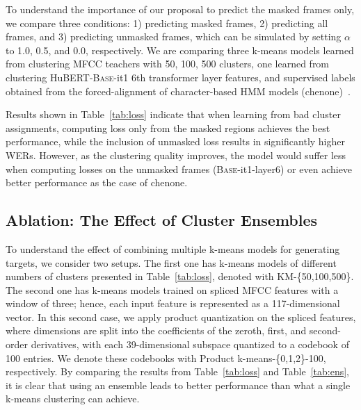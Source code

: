 To understand the importance of our proposal to predict the masked frames only, we compare three conditions: 1) predicting masked frames, 2) predicting all frames, and 3) predicting unmasked frames, which can be simulated by setting $\alpha$ to 1.0, 0.5, and 0.0, respectively. 
We are comparing three k-means models learned from clustering MFCC teachers with 50, 100, 500 clusters, one learned from clustering HuBERT-\textsc{Base}-it1 6th transformer layer features, and supervised labels obtained from the forced-alignment of character-based HMM models (chenone)~\cite{le2019senones}.

Results shown in Table~\ref{tab:loss} indicate that when learning from bad cluster assignments, computing loss only from the masked regions achieves the best performance, while the inclusion of unmasked loss results in significantly higher WERs. 
However, as the clustering quality improves, the model would suffer less when computing losses on the unmasked frames (\textsc{Base}-it1-layer6) or even achieve better performance as the case of chenone.


\subsection{Ablation: The Effect of Cluster Ensembles}
To understand the effect of combining multiple k-means models for generating targets, we consider two setups. The first one has k-means models of different numbers of clusters presented in Table~\ref{tab:loss}, denoted with KM-\{50,100,500\}. The second one has k-means models trained on spliced MFCC features with a window of three; hence, each input feature is represented as a 117-dimensional vector. In this second case, we apply product quantization on the spliced features, where dimensions are split into the coefficients of the zeroth, first, and second-order derivatives, with each 39-dimensional subspace quantized to a codebook of 100 entries. We denote these codebooks with Product k-means-\{0,1,2\}-100, respectively.
By comparing the results from Table~\ref{tab:loss} and Table~\ref{tab:ens}, it is clear that using an ensemble leads to better performance than what a single k-means clustering can achieve.


